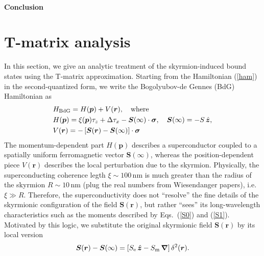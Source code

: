 \documentclass[twocolumn,showpacs,floatfix,nofootinbib,longbibliography]{revtex4-1}
\begin{document}
\paragraph*{Conclusion} \label{sec:conclusion}




\newpage
%



\appendix 

\section{T-matrix analysis} \label{sec:appendixTMatrix}
In this section, we give an analytic treatment of the skyrmion-induced bound states using the T-matrix approximation. Starting from the Hamiltonian (\ref{ham}) in the second-quantized form, we write the Bogolyubov-de Gennes (BdG) Hamiltonian as 
\begin{align}
	& H_{\rm BdG} = H(\bm p) + V(\bm r),\quad {\rm where} \nonumber \\
& H(\bm p) = \xi(\bm p)\tau_z+\Delta \tau_x - \bm S(\infty)\cdot\bm\sigma,\quad \bm S(\infty) = -S\,\hat{\bm z}, \nonumber\\
& V(\bm r) = -\left[ \bm S(\bm r)-\bm S(\infty)\right]\cdot\bm\sigma \label{v0}
\end{align}
The momentum-dependent part $H(\bm p)$ describes a superconductor coupled to a spatially uniform ferromagnetic vector $\bm S(\infty)$, whereas the position-dependent piece $V(\bm r)$ describes the local perturbation due to the skyrmion. Physically, the superconducting coherence legth $\xi\sim 100$\,nm is much greater than the radius of the skyrmion $R\sim 10$\,nm (plug the real numbers from Wiesendanger papers), i.e. $\xi\gg R$. Therefore, the superconductivity does not ``resolve'' the fine details of the skyrmionic configuration of the field  $\bm S(\bm r)$, but rather ``sees'' its long-wavelength characteristics such as the moments described by Eqs.~(\ref{S0}) and (\ref{S1}). Motivated by this logic, we substitute the original skyrmionic field $\bm S(\bm r)$ by its local version 
\begin{equation}
	\bm S(\bm r) - \bm S(\infty) = \left[ S_{\rm e}\, \hat{\bm z} - S_{\rm m}\, \bm \nabla\right] \delta^2(\bm r).
	\label{S}
\end{equation}
\end{document}
